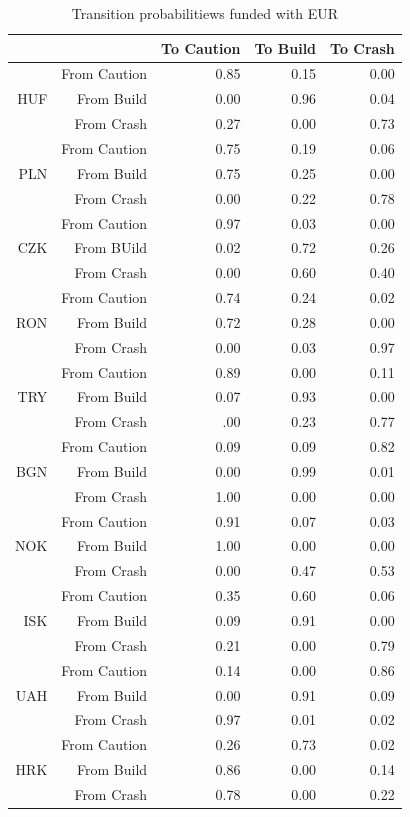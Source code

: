 \documentclass[12pt, a4paper, oneside]{article} %
\begin{document}
\begin{table}[!h]
\centering
\begin{tabular}{rrrrr}
  \hline
 & & To Caution & To Build & To Crash \\ 
  \hline
\multirow{3}{*}{HUF} & From Caution & 0.85 & 0.15 & 0.00  \\ 
   & From Build & 0.00 & 0.96 & 0.04 \\ 
   & From Crash & 0.27 & 0.00 & 0.73 \\ 
\hline
\multirow{3}{*}{PLN} & From Caution & 0.75 & 0.19 & 0.06 \\ 
   & From Build & 0.75 & 0.25 & 0.00 \\ 
   & From Crash & 0.00 & 0.22 & 0.78 \\ 
\hline
\multirow{3}{*}{CZK}  & From Caution & 0.97 & 0.03 & 0.00 \\ 
   & From BUild & 0.02 & 0.72 & 0.26 \\ 
   & From Crash & 0.00 & 0.60 & 0.40 \\ 
\hline
\multirow{3}{*}{RON}& From Caution & 0.74 & 0.24 & 0.02 \\ 
   & From Build & 0.72 & 0.28 & 0.00 \\ 
   & From Crash & 0.00 & 0.03 & 0.97 \\ 
\hline
\multirow{3}{*}{TRY}  & From Caution & 0.89 & 0.00 & 0.11 \\ 
   & From Build & 0.07 & 0.93 & 0.00 \\ 
   & From Crash & .00 & 0.23 & 0.77 \\ 
\hline
\multirow{3}{*}{BGN}  & From Caution & 0.09 & 0.09 & 0.82 \\ 
   & From Build & 0.00 & 0.99 & 0.01 \\ 
   & From Crash & 1.00 & 0.00 & 0.00 \\ 
\hline
\multirow{3}{*}{NOK}  & From Caution & 0.91 & 0.07 & 0.03 \\ 
   & From Build & 1.00 & 0.00 & 0.00 \\ 
  & From Crash & 0.00 & 0.47 & 0.53 \\ 
\hline
\multirow{3}{*}{ISK}   & From Caution & 0.35 & 0.60 & 0.06 \\ 
   & From Build & 0.09 & 0.91 & 0.00 \\ 
   & From Crash & 0.21 & 0.00 & 0.79 \\ 
\hline
\multirow{3}{*}{UAH} & From Caution & 0.14 & 0.00 & 0.86 \\ 
   & From Build & 0.00 & 0.91 & 0.09 \\ 
   & From Crash & 0.97 & 0.01 & 0.02 \\ 
\hline
\multirow{3}{*}{HRK}  & From Caution & 0.26 & 0.73 & 0.02 \\ 
   & From Build  & 0.86 & 0.00 & 0.14 \\ 
   & From Crash & 0.78 & 0.00 & 0.22 \\ 
   \hline
\end{tabular}
\caption{Transition probabilitiews funded with EUR}
\label{tabref:3StateTrans}
\end{table}
\end{document}
